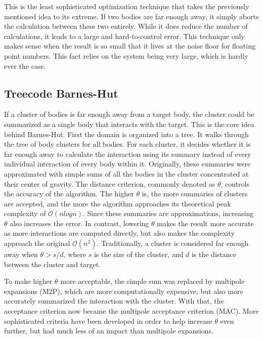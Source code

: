 This is the least sophisticated optimization technique that takes the previously mentioned idea to its extreme.
If two bodies are far enough away, it simply aborts the calculation between these two entirely.
While it does reduce the number of calculations, it leads to a large and hard-to-control error.
This technique only makes sense when the result is so small that it lives at the noise floor for floating point numbers.
This fact relies on the system being very large, which is hardly ever the case.

\subsection{Treecode Barnes-Hut}
\label{sec:optimization-techniques-nbody-bh}

If a cluster of bodies is far enough away from a target body, the cluster could be summarized as a single body that interacts with the target.
This is the core idea behind Barnes-Hut.
First the domain is organized into a tree.
It walks through the tree of body clusters for all bodies. For each cluster, it decides whether it is far enough away to calculate the interaction using its summary instead of every individual interaction of every body within it.
Originally, these summaries were approximated with simple sums of all the bodies in the cluster concentrated at their center of gravity.
The distance criterion, commonly denoted as $\theta$, controls the accuracy of the algorithm.
The higher $\theta$ is, the more summaries of clusters are accepted, and the more the algorithm approaches its theoretical peak complexity of \(\mathcal{O}(n log n)\).
Since these summaries are approximations, increasing $\theta$ also increases the error.
In contrast, lowering $\theta$ makes the result more accurate as more interactions are computed directly, but also makes the complexity approach the original \(\mathcal{O}(n^2)\).
Traditionally, a cluster is considered far enough away when $\theta > s/d$, where $s$ is the size of the cluster, and $d$ is the distance between the cluster and target.

To make higher $\theta$ more acceptable, the simple sum was replaced by multipole expansions (M2P), which are more computationally expensive, but also more accurately summarized the interaction with the cluster.
With that, the acceptance criterion now became the multipole acceptance criterion (MAC).
More sophisticated criteria have been developed in order to help increase $\theta$ even further, but had much less of an impact than multipole expansions.

